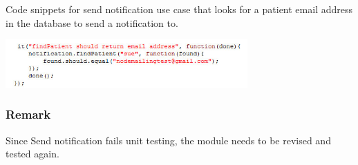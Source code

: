 Code snippets for send notification use case that looks for a patient email address in the database to send a notification to.	
\newline

\includegraphics[width=350px]{./TestingDoc/Graphics/find}

\subsubsection*{Remark}
Since Send notification fails unit testing, the module needs to be revised and tested again.